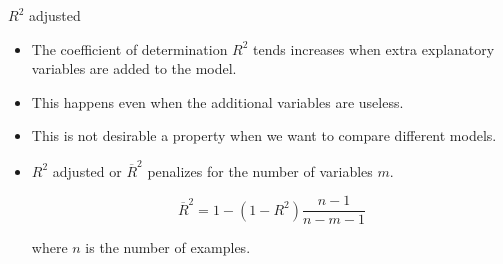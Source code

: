 \documentclass[handout]{beamer}
\begin{document}
\begin{frame}{$R^2$ adjusted}
 \scriptsize{
 \begin{itemize}
  \item The coefficient of determination $R^2$ tends increases when extra explanatory variables are added to the model.
  
  \item This happens even when the additional variables are useless.
  
  \item This is not desirable a property  when we want to compare different models.

\item $R^2$ adjusted or $\overline{R}^2$ penalizes for the number of variables $m$.
 
\begin{displaymath}
 \overline{R}^2= 1-(1-R^2)\frac{n-1}{n-m-1}
\end{displaymath}

where $n$ is the number of examples.

 \end{itemize}
 }
\end{frame}
\end{document}

